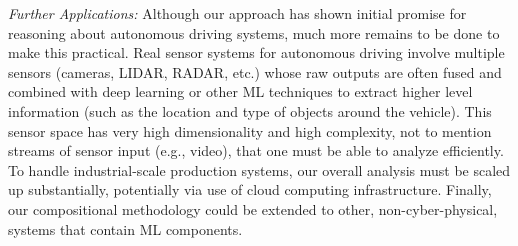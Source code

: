 \noindent
{\em Further Applications:}
Although our approach has shown initial promise for reasoning about
autonomous driving systems, much more remains to be done to make this
practical. Real sensor systems for autonomous driving involve multiple sensors
(cameras, LIDAR, RADAR, etc.) whose raw outputs are often fused and 
combined with deep learning or other ML techniques to
extract higher level information (such as the location and type
of objects around the vehicle). This sensor space has very high
dimensionality and high complexity, not to mention 
streams of sensor input (e.g., video), that one must be able to analyze
efficiently.
To handle industrial-scale production systems, our overall analysis
must be scaled up substantially,
potentially via use of cloud computing infrastructure.
Finally, our compositional 
methodology could be extended to other, non-cyber-physical,
systems that contain ML components.
